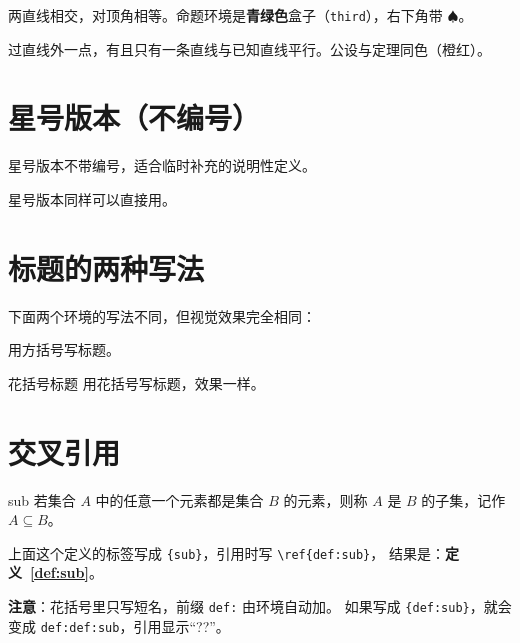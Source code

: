 \documentclass[lang=cn,newtx,10pt,scheme=chinese,nofont]{elegantbook}
\begin{document}
\begin{proposition}[对顶角相等]
两直线相交，对顶角相等。命题环境是\textbf{青绿色}盒子（\texttt{third}），右下角带 $\spadesuit$。
\end{proposition}

\begin{postulate}[平行公设]
过直线外一点，有且只有一条直线与已知直线平行。公设与定理同色（橙红）。
\end{postulate}

\section{星号版本（不编号）}

\begin{definition*}[不编号的定义]
星号版本不带编号，适合临时补充的说明性定义。
\end{definition*}

\begin{theorem*}[不编号的定理]
星号版本同样可以直接用。
\end{theorem*}

\section{标题的两种写法}

下面两个环境的写法不同，但视觉效果完全相同：

\begin{theorem}[方括号标题]
用方括号写标题。
\end{theorem}

\begin{theorem}{花括号标题}
用花括号写标题，效果一样。
\end{theorem}

\section{交叉引用}

\begin{definition}[子集]{sub}
若集合 $A$ 中的任意一个元素都是集合 $B$ 的元素，则称 $A$ 是 $B$ 的子集，记作 $A \subseteq B$。
\end{definition}

上面这个定义的标签写成 \texttt{\{sub\}}，引用时写 \texttt{\textbackslash ref\{def:sub\}}，
结果是：\textbf{定义~\ref{def:sub}}。

\textbf{注意}：花括号里只写短名，前缀 \texttt{def:} 由环境自动加。
如果写成 \texttt{\{def:sub\}}，就会变成 \texttt{def:def:sub}，引用显示“??”。
\end{document}
